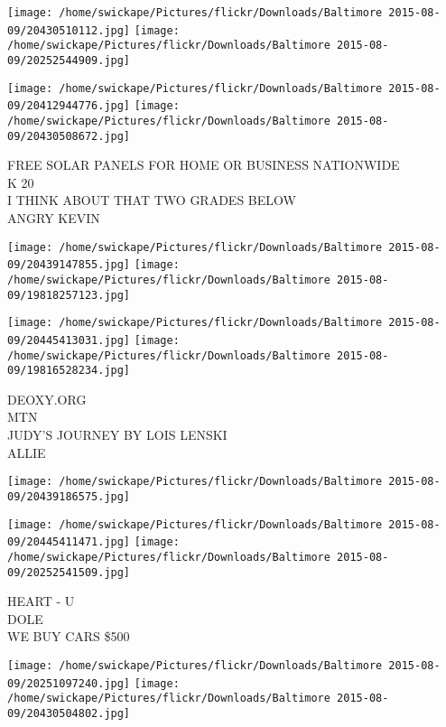 \documentclass[10pt,letterpaper]{article}
\begin{document}
\texttt{[image: /home/swickape/Pictures/flickr/Downloads/Baltimore 2015-08-09/20430510112.jpg]}
\texttt{[image: /home/swickape/Pictures/flickr/Downloads/Baltimore 2015-08-09/20252544909.jpg]}

\texttt{[image: /home/swickape/Pictures/flickr/Downloads/Baltimore 2015-08-09/20412944776.jpg]}
\texttt{[image: /home/swickape/Pictures/flickr/Downloads/Baltimore 2015-08-09/20430508672.jpg]}

FREE SOLAR PANELS FOR HOME OR BUSINESS NATIONWIDE\\
K 20\\
I THINK ABOUT THAT TWO GRADES BELOW\\
ANGRY KEVIN\\
\pagebreak

\texttt{[image: /home/swickape/Pictures/flickr/Downloads/Baltimore 2015-08-09/20439147855.jpg]}
\texttt{[image: /home/swickape/Pictures/flickr/Downloads/Baltimore 2015-08-09/19818257123.jpg]}

\texttt{[image: /home/swickape/Pictures/flickr/Downloads/Baltimore 2015-08-09/20445413031.jpg]}
\texttt{[image: /home/swickape/Pictures/flickr/Downloads/Baltimore 2015-08-09/19816528234.jpg]}

DEOXY.ORG\\
MTN\\
JUDY'S JOURNEY BY LOIS LENSKI\\
ALLIE\\
\pagebreak

\texttt{[image: /home/swickape/Pictures/flickr/Downloads/Baltimore 2015-08-09/20439186575.jpg]}

\vspace{0.25in}
\texttt{[image: /home/swickape/Pictures/flickr/Downloads/Baltimore 2015-08-09/20445411471.jpg]}
\texttt{[image: /home/swickape/Pictures/flickr/Downloads/Baltimore 2015-08-09/20252541509.jpg]}

HEART {-} U\\
DOLE\\
WE BUY CARS \$500\\
\pagebreak

\texttt{[image: /home/swickape/Pictures/flickr/Downloads/Baltimore 2015-08-09/20251097240.jpg]}
\texttt{[image: /home/swickape/Pictures/flickr/Downloads/Baltimore 2015-08-09/20430504802.jpg]}
\end{document}
